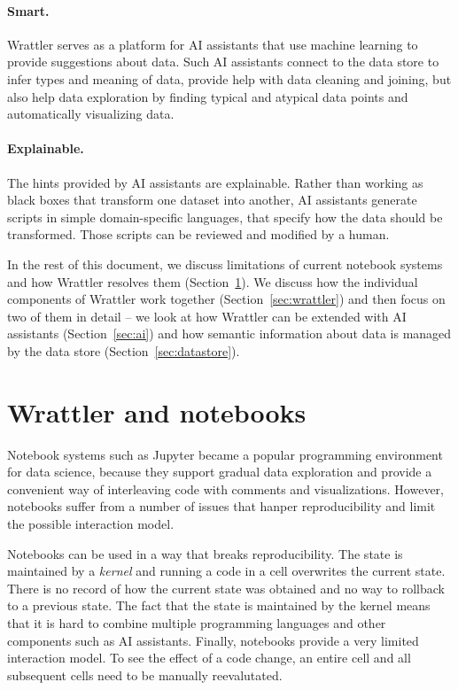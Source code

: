 \documentclass[sigplan,preprint,10pt]{acmart}\settopmatter{printfolios=true,printccs=false,printacmref=false}
\theoremstyle{plain}
\theoremstyle{definition}
\begin{document}
\paragraph{Smart.}
Wrattler serves as a platform for AI assistants that use machine learning to provide suggestions 
about data. Such AI assistants connect to the data store to infer types and meaning of data, provide 
help with data cleaning and joining, but also help data exploration by finding typical and atypical 
data points and automatically visualizing data.

\paragraph{Explainable.}
The hints provided by AI assistants are explainable. Rather than working as black boxes that 
transform one dataset into another, AI assistants generate scripts in simple domain-specific
languages, that specify how the data should be transformed. Those scripts can be reviewed 
and modified by a human.

\vspace{0.5em}
\noindent
In the rest of this document, we discuss limitations of current notebook systems and how Wrattler
resolves them (Section~\ref{sec:overview}). We discuss how the individual components of Wrattler
work together (Section~\ref{sec:wrattler}) and then focus on two of them in detail --
we look at how Wrattler can be extended with AI assistants (Section~\ref{sec:ai}) and
how semantic information about data is managed by the data store (Section~\ref{sec:datastore}).


\section{Wrattler and notebooks}
\label{sec:overview}

Notebook systems such as Jupyter became a popular programming environment for data science, because 
they support gradual data exploration and provide a convenient way of interleaving code with 
comments and visualizations. However, notebooks suffer from a number of issues that hanper 
reproducibility and limit the possible interaction model.

Notebooks can be used in a way that breaks reproducibility. The state is maintained by a \emph{kernel} 
and running a code in a cell overwrites the current state. There is no record of how the current 
state was obtained and no way to rollback to a previous state. The fact that the state is 
maintained by the kernel means that it is hard to combine multiple programming languages and
other components such as AI assistants. Finally, notebooks provide a very limited interaction 
model. To see the effect of a code change, an entire cell and all subsequent cells need to be
manually reevalutated.
\end{document}
